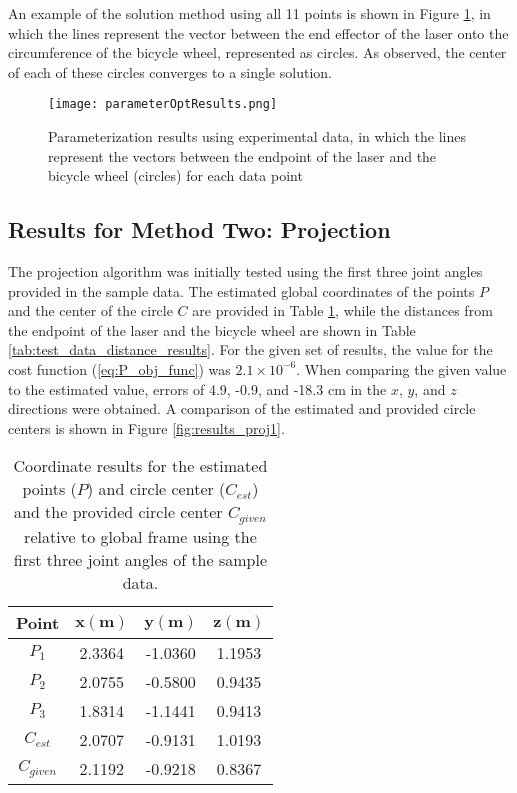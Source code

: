 \documentclass[12pt]{article}
\begin{document}
An example of the solution method using all 11 points is shown in Figure \ref{fig:parameterOptResults}, in which the lines represent the vector between the end effector of the laser onto the circumference of the bicycle wheel, represented as circles. As observed, the center of each of these circles converges to a single solution.   

\begin{figure}[!ht]
  {\texttt{[image: parameterOptResults.png]}}
  \centering
  \caption{Parameterization results using experimental data, in which the lines represent the vectors between the endpoint of the laser and the bicycle wheel (circles) for each data point} 
  \centering
  \label{fig:parameterOptResults}
\end{figure}

\subsection{Results for Method Two:  Projection}

The projection algorithm was initially tested using the first three joint angles provided in the sample data.  The estimated global coordinates of the points $P$ and the center of the circle $C$ are provided in Table \ref{tab:test_data_point_results}, while the distances from the endpoint of the laser and the bicycle wheel are shown in Table \ref{tab:test_data_distance_results}. For the given set of results, the value for the cost function (\ref{eq:P_obj_func}) was $2.1\times10^{-6}$.  When comparing the given value to the estimated value, errors of 4.9, -0.9, and -18.3 cm in the $x$,  $y$, and $z$ directions were obtained. A comparison of the estimated and provided circle centers is shown in Figure \ref{fig:results_proj1}.

\begin{table}[ht!]
\begin{center}
\begin{tabular}{|c|c|c|c|}
\hline
\textbf{Point}  & $\boldsymbol{x (m)}$  & $\boldsymbol{y (m)}$ & $\boldsymbol{z (m)}$  \\ \hline
$P_1$  & 2.3364      & -1.0360     & 1.1953      \\ \hline
$P_2$  & 2.0755      & -0.5800     & 0.9435      \\ \hline
$P_3$  & 1.8314      & -1.1441     & 0.9413      \\ \hline
$C_{est}$    & 2.0707      & -0.9131     & 1.0193      \\ \hline
$C_{given}$    & 2.1192      & -0.9218     & 0.8367      \\ \hline
\end{tabular}
\caption{Coordinate results for the estimated points ($P$) and circle center ($C_{est}$) and the provided circle center $C_{given}$ relative to global frame using the first three joint angles of the sample data.}
\label{tab:test_data_point_results}
\end{center}
\end{table}
\end{document}
